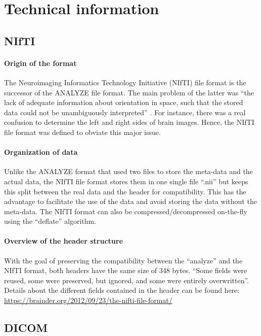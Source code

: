 
\chapter{Technical information}
\label{ch:technical_info}

\section{NIfTI}

\subsubsection{Origin of the format}
The Neuroimaging Informatics Technology Initiative (NIfTI) file format is the successor of the ANALYZE file format. The main problem of the latter was “the lack of adequate information about orientation in space, such that the stored data could not be unambiguously interpreted” .  For instance, there was a real confusion to determine the left and right sides of brain images.  Hence, the NIfTI file format was defined to obviate this major issue.


\subsubsection{Organization of data}
Unlike the ANALYZE format that used two files to store the meta-data and the actual data, the NIfTI file format stores them in one single file “.nii” but keeps this split between the real data and the header for compatibility. This has the advantage to facilitate the use of the data and avoid storing the data without the meta-data. The NIfTI format can also be compressed/decompressed on-the-fly using the “deflate”  algorithm.


\subsubsection{Overview of the header structure}
With the goal of preserving the compatibility between the “analyze” and the NIfTI format, both headers have the same size of 348 bytes. “Some fields were reused, some were preserved, but ignored, and some were entirely overwritten”. Details about the different fields contained in the header can be found here: \url{https://brainder.org/2012/09/23/the-nifti-file-format/}


\section{DICOM}

